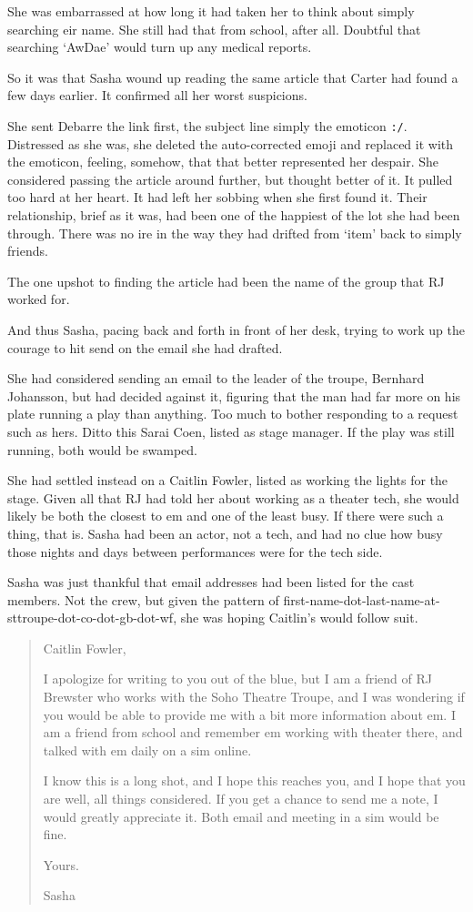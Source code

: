 She was embarrassed at how long it had taken her to think about simply searching eir name. She still had that from school, after all. Doubtful that searching `AwDae' would turn up any medical reports.

So it was that Sasha wound up reading the same article that Carter had found a few days earlier. It confirmed all her worst suspicions.

She sent Debarre the link first, the subject line simply the emoticon \texttt{:/}. Distressed as she was, she deleted the auto-corrected emoji and replaced it with the emoticon, feeling, somehow, that that better represented her despair. She considered passing the article around further, but thought better of it. It pulled too hard at her heart. It had left her sobbing when she first found it. Their relationship, brief as it was, had been one of the happiest of the lot she had been through. There was no ire in the way they had drifted from `item' back to simply friends.

The one upshot to finding the article had been the name of the group that RJ worked for.

And thus Sasha, pacing back and forth in front of her desk, trying to work up the courage to hit send on the email she had drafted.

She had considered sending an email to the leader of the troupe, Bernhard Johansson, but had decided against it, figuring that the man had far more on his plate running a play than anything. Too much to bother responding to a request such as hers. Ditto this Sarai Coen, listed as stage manager. If the play was still running, both would be swamped.

She had settled instead on a Caitlin Fowler, listed as working the lights for the stage. Given all that RJ had told her about working as a theater tech, she would likely be both the closest to em and one of the least busy. If there were such a thing, that is. Sasha had been an actor, not a tech, and had no clue how busy those nights and days between performances were for the tech side.

Sasha was just thankful that email addresses had been listed for the cast members. Not the crew, but given the pattern of first-name-dot-last-name-at-sttroupe-dot-co-dot-gb-dot-wf, she was hoping Caitlin's would follow suit.

\begin{quote}
Caitlin Fowler,

I apologize for writing to you out of the blue, but I am a friend of RJ Brewster who works with the Soho Theatre Troupe, and I was wondering if you would be able to provide me with a bit more information about em. I am a friend from school and remember em working with theater there, and talked with em daily on a sim online.

I know this is a long shot, and I hope this reaches you, and I hope that you are well, all things considered. If you get a chance to send me a note, I would greatly appreciate it. Both email and meeting in a sim would be fine.

Yours.

Sasha
\end{quote}

